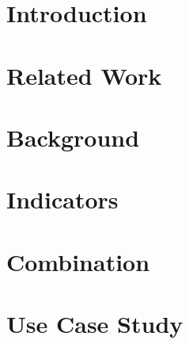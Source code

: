 
\addtolength{\evensidemargin}{-12mm}

%
%
\part[Introduction]{Introduction}
\label{part:introAndBackgroundTheory}


%

\part[Related Work]{Related Work}
\label{part:relatedWork}


\part[Background]{Background}
\label{part:background}


\part{Indicators}
\label{part:indicators}


\part{Combination}
\label{part:combination}


\part{Use Case Study}
\label{part:use_case_study}


%
% 
%
% 
% 


